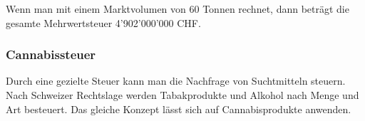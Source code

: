 \documentclass[../main.tex]{subfiles}
\begin{document}
	 \noindent
	 Wenn man mit einem Marktvolumen von 60 Tonnen rechnet, dann beträgt die gesamte Mehrwertsteuer 4’902’000’000 CHF.
	 
	 \subsubsection{Cannabissteuer}
	 Durch eine gezielte Steuer kann man die Nachfrage von Suchtmitteln steuern. Nach Schweizer Rechtslage werden Tabakprodukte und Alkohol nach Menge und Art besteuert. 
	 Das gleiche Konzept lässt sich auf Cannabisprodukte anwenden. 
	 
	 
	 
\end{document}
